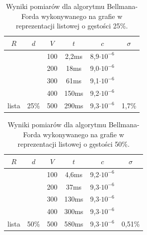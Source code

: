 \documentclass[a4paper,12pt]{article}
\begin{document}
\begin{table}[H]
	\centering
	\caption{\centering Wyniki pomiarów dla algorytmu Bellmana-Forda wykonywanego na grafie w reprezentacji listowej o gęstości 25\%.}
	\begin{tabular}{|c|c|c|c|c|c|}
		\hline
		\rowcolor[HTML]{C0C0C0} 
		$R$                     & $d$                    & $V$ & \multicolumn{1}{c|}{\cellcolor[HTML]{C0C0C0}$t$} & $c$                & $\sigma$                \\ \hline
		&                        & 100 & 2,2ms                                            & 8,9$\cdot 10^{-6}$ &                         \\ \cline{3-5}
		&                        & 200 & 18ms                                             & 9,0$\cdot 10^{-6}$ &                         \\ \cline{3-5}
		&                        & 300 & 61ms                                             & 9,1$\cdot 10^{-6}$ &                         \\ \cline{3-5}
		&                        & 400 & 150ms                                            & 9,2$\cdot 10^{-6}$ &                         \\ \cline{3-5}
		\multirow{-5}{*}{lista} & \multirow{-5}{*}{25\%} & 500 & 290ms                                            & 9,3$\cdot 10^{-6}$ & \multirow{-5}{*}{1,7\%} \\ \hline
	\end{tabular}
\end{table}

\begin{table}[H]
	\centering
	\caption{\centering Wyniki pomiarów dla algorytmu Bellmana-Forda wykonywanego na grafie w reprezentacji listowej o gęstości 50\%.}
	\begin{tabular}{|c|c|c|c|c|c|}
		\hline
		\rowcolor[HTML]{C0C0C0} 
		$R$                     & $d$                    & $V$ & \multicolumn{1}{c|}{\cellcolor[HTML]{C0C0C0}$t$} & $c$                & $\sigma$                 \\ \hline
		&                        & 100 & 4,6ms                                            & 9,2$\cdot 10^{-6}$ &                          \\ \cline{3-5}
		&                        & 200 & 37ms                                             & 9,3$\cdot 10^{-6}$ &                          \\ \cline{3-5}
		&                        & 300 & 130ms                                            & 9,3$\cdot 10^{-6}$ &                          \\ \cline{3-5}
		&                        & 400 & 300ms                                            & 9,3$\cdot 10^{-6}$ &                          \\ \cline{3-5}
		\multirow{-5}{*}{lista} & \multirow{-5}{*}{50\%} & 500 & 580ms                                            & 9,3$\cdot 10^{-6}$ & \multirow{-5}{*}{0,51\%} \\ \hline
	\end{tabular}
\end{table}
\end{document}
